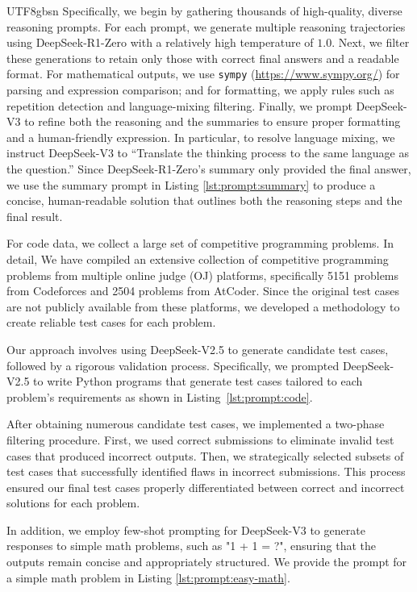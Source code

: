\documentclass[11pt, a4paper, logo, copyright, nonumbering]{deepseek}
\newcommand{\dsro}{DeepSeek-R1-Zero}
\begin{document}
\begin{CJK*}{UTF8}{gbsn}
Specifically, we begin by gathering thousands of high-quality, diverse reasoning prompts. For each prompt, we generate multiple reasoning trajectories using \dsro{} with a relatively high temperature of $1.0$. Next, we filter these generations to retain only those with correct final answers and a readable format. For mathematical outputs, we use \texttt{sympy} ({\url{https://www.sympy.org/}}) for parsing and expression comparison; and for formatting, we apply rules such as repetition detection and language-mixing filtering. Finally, we prompt DeepSeek-V3 to refine both the reasoning and the summaries to ensure proper formatting and a human-friendly expression.
In particular, to resolve language mixing, we instruct DeepSeek-V3 to ``Translate the thinking process to the same language as the question.'' Since DeepSeek-R1-Zero's summary only provided the final answer, we use the summary prompt in Listing \ref{lst:prompt:summary} to produce a concise, human-readable solution that outlines both the reasoning steps and the final result.

For code data, we collect a large set of competitive programming problems. In detail, We have compiled an extensive collection of competitive programming problems from multiple online judge (OJ) platforms, specifically 5151 problems from Codeforces and 2504 problems from AtCoder. Since the original test cases are not publicly available from these platforms, we developed a methodology to create reliable test cases for each problem.

Our approach involves using DeepSeek-V2.5 to generate candidate test cases, followed by a rigorous validation process. Specifically, we prompted DeepSeek-V2.5 to write Python programs that generate test cases tailored to each problem's requirements as shown in Listing~\ref{lst:prompt:code}.

After obtaining numerous candidate test cases, we implemented a two-phase filtering procedure. First, we used correct submissions to eliminate invalid test cases that produced incorrect outputs. Then, we strategically selected subsets of test cases that successfully identified flaws in incorrect submissions. This process ensured our final test cases properly differentiated between correct and incorrect solutions for each problem. 



In addition, we employ few-shot prompting for DeepSeek-V3 to generate responses to simple math problems, such as "1 + 1 = ?", ensuring that the outputs remain concise and appropriately structured.  We provide the prompt for a simple math problem in Listing \ref{lst:prompt:easy-math}.


\end{CJK*}
\end{document}
